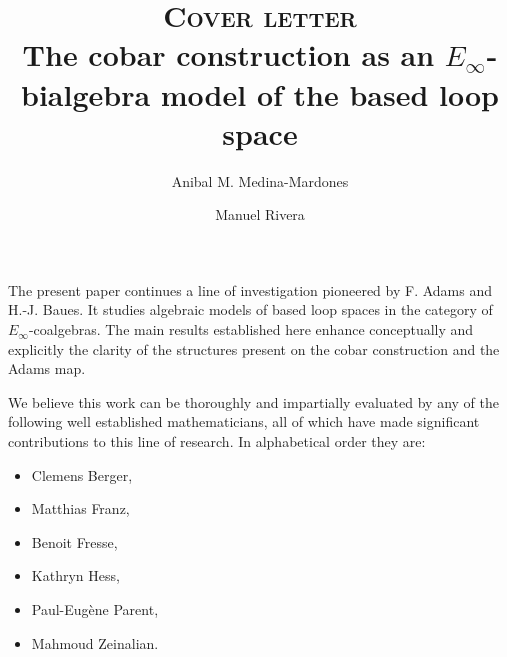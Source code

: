 \documentclass{article}
\title{\textsc{Cover letter} \\ The cobar construction as an $E_{\infty}$-bialgebra model of the based loop space}
\author{Anibal M. Medina-Mardones \and Manuel Rivera}
\begin{document}
	\maketitle
	The present paper continues a line of investigation pioneered by F. Adams and H.-J. Baues.
	It studies algebraic models of based loop spaces in the category of $E_\infty$-coalgebras.
	The main results established here enhance conceptually and explicitly the clarity of the structures present on the cobar construction and the Adams map.

	We believe this work can be thoroughly and impartially evaluated by any of the following well established mathematicians, all of which have made significant contributions to this line of research.
	In alphabetical order they are:
	\begin{itemize}
		\item Clemens Berger,
		\item Matthias Franz,
		\item Benoit Fresse,
		\item Kathryn Hess,
		\item Paul-Eugène Parent,
		\item Mahmoud Zeinalian.
	\end{itemize}
\end{document}
